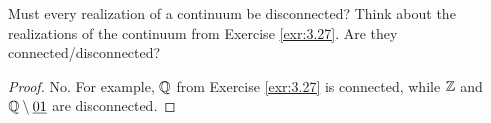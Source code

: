 \documentclass[../main.tex]{subfiles}
\begin{document}
\begin{exercise}\label{exr:4.24}
    Must every realization of a continuum be disconnected? Think about the realizations of the continuum from Exercise \ref{exr:3.27}. Are they connected/disconnected?
    \begin{proof}
        No. For example, $\mathbb{Q}$ from Exercise \ref{exr:3.27} is connected, while $\mathbb{Z}$ and $\mathbb{Q}\setminus\underline{01}$ are disconnected.
    \end{proof}
\end{exercise}
\end{document}
